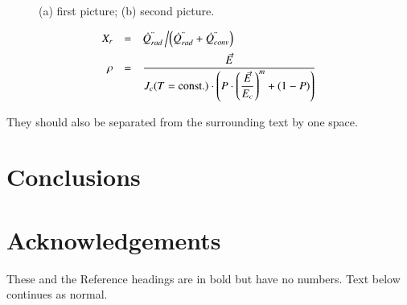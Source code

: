 \documentclass[3p,times,procedia]{elsarticle}
\begin{document}
\begin{figure}[h]
\caption{(a) first picture; (b) second picture.}
\end{figure}


\begin{equation}
\begin{array}{rcl}
\displaystyle X_r &=& \displaystyle\dot{Q}^{"}_{rad}\left/\left(\dot{Q}^{"}_{rad} + \dot{Q}^{"}_{conv}\right)\right.\\[6pt]
\displaystyle \rho &=& \displaystyle\frac{\vec{E}}{J_c(T={\rm const.})\cdot\left(P\cdot\left(\displaystyle\frac{\vec{E}}{E_c}\right)^m+(1-P)\right)}
\end{array}
\end{equation}

They should also be separated from the surrounding text by one space.

\section{Conclusions}


\section*{Acknowledgements}

These and the Reference headings are in bold but have no numbers. Text below continues as normal.














\end{document}
